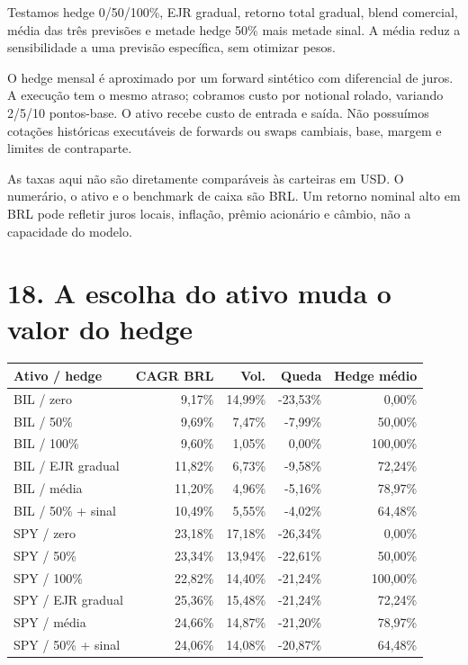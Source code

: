 \documentclass[11pt,a4paper]{article}
\begin{document}
Testamos hedge 0/50/100\%, EJR gradual, retorno total gradual, blend comercial, média das três previsões e metade hedge 50\% mais metade sinal. A média reduz a sensibilidade a uma previsão específica, sem otimizar pesos.

O hedge mensal é aproximado por um forward sintético com diferencial de juros. A execução tem o mesmo atraso; cobramos custo por notional rolado, variando 2/5/10 pontos-base. O ativo recebe custo de entrada e saída. Não possuímos cotações históricas executáveis de forwards ou swaps cambiais, base, margem e limites de contraparte.

As taxas aqui não são diretamente comparáveis às carteiras em USD. O numerário, o ativo e o benchmark de caixa são BRL. Um retorno nominal alto em BRL pode refletir juros locais, inflação, prêmio acionário e câmbio, não a capacidade do modelo.

\clearpage
\section*{18. A escolha do ativo muda o valor do hedge}
\footnotesize\begin{center}\begin{tabular}{lrrrr}\toprule Ativo / hedge & CAGR BRL & Vol. & Queda & Hedge médio\\\midrule 
BIL / zero & 9,17\% & 14,99\% & -23,53\% & 0,00\%\\
BIL / 50\% & 9,69\% & 7,47\% & -7,99\% & 50,00\%\\
BIL / 100\% & 9,60\% & 1,05\% & 0,00\% & 100,00\%\\
BIL / EJR gradual & 11,82\% & 6,73\% & -9,58\% & 72,24\%\\
BIL / média & 11,20\% & 4,96\% & -5,16\% & 78,97\%\\
BIL / 50\% + sinal & 10,49\% & 5,55\% & -4,02\% & 64,48\%\\
SPY / zero & 23,18\% & 17,18\% & -26,34\% & 0,00\%\\
SPY / 50\% & 23,34\% & 13,94\% & -22,61\% & 50,00\%\\
SPY / 100\% & 22,82\% & 14,40\% & -21,24\% & 100,00\%\\
SPY / EJR gradual & 25,36\% & 15,48\% & -21,24\% & 72,24\%\\
SPY / média & 24,66\% & 14,87\% & -21,20\% & 78,97\%\\
SPY / 50\% + sinal & 24,06\% & 14,08\% & -20,87\% & 64,48\%\\\bottomrule\end{tabular}\end{center}\normalsize
\end{document}
